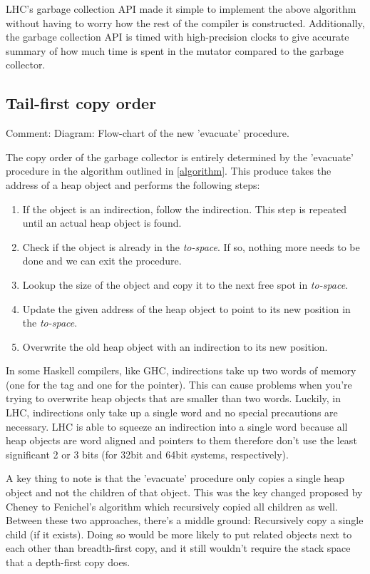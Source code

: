 \documentclass[a4paper,oneside]{memoir}
\newcommand{\makecomment}[1]{{\color{red} Comment: #1}}
\begin{document}
LHC's garbage collection API made it simple to implement the above algorithm
without having to worry how the rest of the compiler is constructed.
Additionally, the garbage collection API is timed with high-precision clocks
to give accurate summary of how much time is spent in the mutator compared to
the garbage collector.

\subsection{Tail-first copy order}

\makecomment{Diagram: Flow-chart of the new 'evacuate' procedure.}

The copy order of the garbage collector is entirely determined by the 'evacuate'
procedure in the algorithm outlined in \ref{algorithm}. This produce takes the
address of a heap object and performs the following steps:
\begin{enumerate}
  \item If the object is an indirection, follow the indirection. This step is
  repeated until an actual heap object is found.
  \item Check if the object is already in the \emph{to-space}. If so, nothing
  more needs to be done and we can exit the procedure.
  \item Lookup the size of the object and copy it to the next free spot in
  \emph{to-space}.
  \item Update the given address of the heap object to point to its new position
  in the \emph{to-space}.
  \item Overwrite the old heap object with an indirection to its new position.
\end{enumerate}

In some Haskell compilers, like GHC, indirections take up two words of memory
(one for the tag and one for the pointer). This can cause problems when you're
trying to overwrite heap objects that are smaller than two words. Luckily, in
LHC, indirections only take up a single word and no special precautions are
necessary. LHC is able to squeeze an indirection into a single word because
all heap objects are word aligned and pointers to them therefore don't use the
least significant 2 or 3 bits (for 32bit and 64bit systems, respectively).

A key thing to note is that the 'evacuate' procedure only copies a single heap
object and not the children of that object. This was the key changed proposed
by Cheney to Fenichel's algorithm which recursively copied all children as well.
\cite{Fenichel,Cheney:1970} Between these two approaches, there's a middle
ground: Recursively copy a single child (if it exists). Doing so would be more
likely to put related objects next to each other than breadth-first copy, and
it still wouldn't require the stack space that a depth-first copy does.
\end{document}
